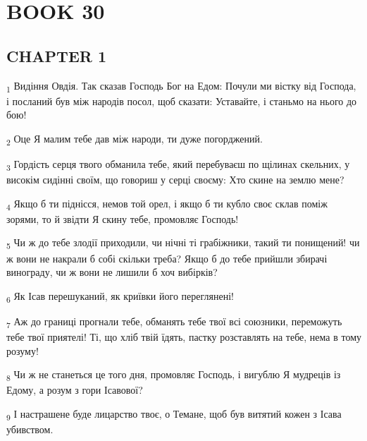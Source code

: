 \section{BOOK 30}
\subsection{CHAPTER 1}
\begin{tcolorbox}
\textsubscript{1} Видіння Овдія. Так сказав Господь Бог на Едом: Почули ми вістку від Господа, і посланий був між народів посол, щоб сказати: Уставайте, і станьмо на нього до бою!
\end{tcolorbox}
\begin{tcolorbox}
\textsubscript{2} Оце Я малим тебе дав між народи, ти дуже погорджений.
\end{tcolorbox}
\begin{tcolorbox}
\textsubscript{3} Гордість серця твого обманила тебе, який перебуваєш по щілинах скельних, у високім сидінні своїм, що говориш у серці своєму: Хто скине на землю мене?
\end{tcolorbox}
\begin{tcolorbox}
\textsubscript{4} Якщо б ти піднісся, немов той орел, і якщо б ти кубло своє склав поміж зорями, то й звідти Я скину тебе, промовляє Господь!
\end{tcolorbox}
\begin{tcolorbox}
\textsubscript{5} Чи ж до тебе злодії приходили, чи нічні ті грабіжники, такий ти понищений! чи ж вони не накрали б собі скільки треба? Якщо б до тебе прийшли збирачі винограду, чи ж вони не лишили б хоч вибірків?
\end{tcolorbox}
\begin{tcolorbox}
\textsubscript{6} Як Ісав перешуканий, як криївки його переглянені!
\end{tcolorbox}
\begin{tcolorbox}
\textsubscript{7} Аж до границі прогнали тебе, обманять тебе твої всі союзники, переможуть тебе твої приятелі! Ті, що хліб твій їдять, пастку розставлять на тебе, нема в тому розуму!
\end{tcolorbox}
\begin{tcolorbox}
\textsubscript{8} Чи ж не станеться це того дня, промовляє Господь, і вигублю Я мудреців із Едому, а розум з гори Ісавової?
\end{tcolorbox}
\begin{tcolorbox}
\textsubscript{9} І настрашене буде лицарство твоє, о Темане, щоб був витятий кожен з Ісава убивством.
\end{tcolorbox}
